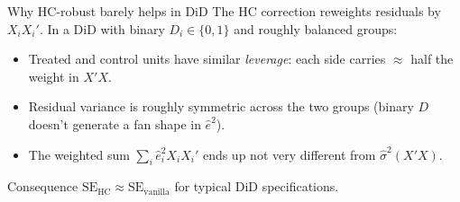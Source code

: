 \documentclass[aspectratio=169,11pt]{beamer}
\begin{document}
\begin{frame}{Why HC-robust barely helps in DiD}
\vspace{0.4em}
The HC correction reweights residuals by $X_i X_i'$. In a DiD with binary $D_i \in \{0,1\}$ and roughly balanced groups:
\vspace{0.4em}
\begin{itemize}
  \item Treated and control units have similar \textit{leverage}: each side carries $\approx$ half the weight in $X'X$.
  \item Residual variance is roughly symmetric across the two groups (binary $D$ doesn't generate a fan shape in $\hat e^2$).
  \item The weighted sum $\sum_i \hat e_i^2 X_i X_i'$ ends up not very different from $\hat\sigma^2(X'X)$.
\end{itemize}
\vspace{0.4em}
\begin{block}{Consequence}
\small
$\text{SE}_{\text{HC}} \approx \text{SE}_{\text{vanilla}}$ for typical DiD specifications. \\
\end{block}
\end{frame}
\end{document}
